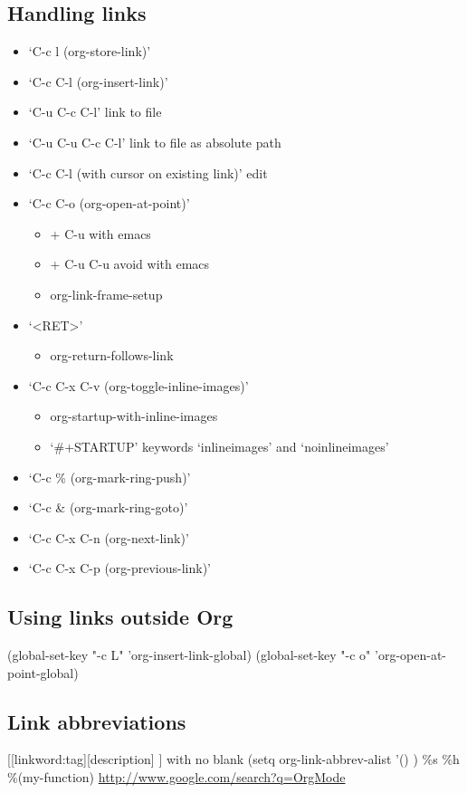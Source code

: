\documentclass[11pt]{article}
\begin{document}
\subsection{Handling links}
\label{sec:orgb79d198}
\begin{itemize}
\item ‘C-c l     (org-store-link)’
\item ‘C-c C-l     (org-insert-link)’
\item ‘C-u C-c C-l’  link to file
\item ‘C-u C-u C-c C-l’ link to file as absolute path
\item ‘C-c C-l  (with cursor on existing link)’   edit
\item ‘C-c C-o     (org-open-at-point)’
\begin{itemize}
\item + C-u  with emacs
\item + C-u C-u  avoid with emacs
\item org-link-frame-setup
\end{itemize}
\item ‘<RET>’
\begin{itemize}
\item org-return-follows-link
\end{itemize}
\item ‘C-c C-x C-v     (org-toggle-inline-images)’
\begin{itemize}
\item org-startup-with-inline-images
\item ‘\#+STARTUP’ keywords ‘inlineimages’ and ‘noinlineimages’
\end{itemize}
\item ‘C-c \%     (org-mark-ring-push)’
\item ‘C-c \&     (org-mark-ring-goto)’
\item ‘C-c C-x C-n     (org-next-link)’
\item ‘C-c C-x C-p     (org-previous-link)’
\end{itemize}

\subsection{Using links outside Org}
\label{sec:orga450ba4}
(global-set-key "\C-c L" 'org-insert-link-global)
(global-set-key "\C-c o" 'org-open-at-point-global)
\subsection{Link abbreviations}
\label{sec:orgf86a0fd}
[[linkword:tag][description] ]  with no blank
(setq org-link-abbrev-alist
 '()
)
\%s \%h \%(my-function)
\url{http://www.google.com/search?q=OrgMode}
\end{document}
